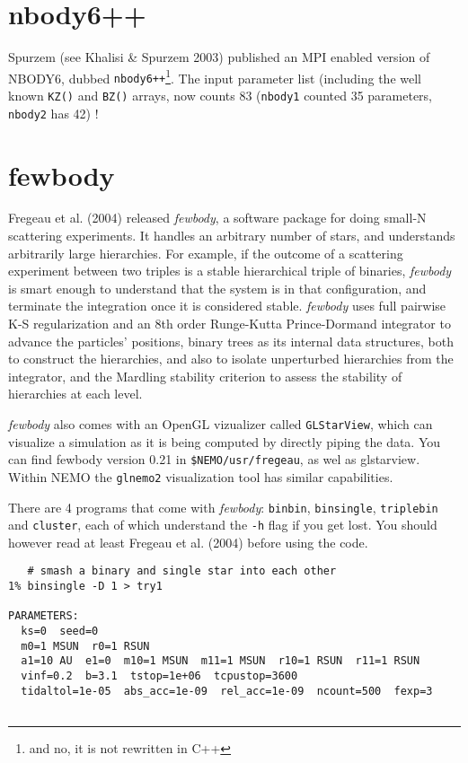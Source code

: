 {\section{nbody6++}

Spurzem (see Khalisi \& Spurzem 2003) published an MPI enabled version
of NBODY6, dubbed {\tt nbody6++}\footnote{and no, it is not rewritten in C++}.
The input parameter list (including the well known {\tt KZ()} and {\tt BZ()}
arrays, now counts 83  ({\tt nbody1} counted 35 parameters, {\tt nbody2} has 42) !

\section{fewbody}

Fregeau et al. (2004) released 
{\it fewbody}, a software package for doing
small-N scattering experiments. It handles an arbitrary number of stars,
and understands arbitrarily large hierarchies. For example, if the
outcome of a scattering experiment between two triples is a stable
hierarchical triple of binaries, {\it fewbody} is smart enough to
understand that the system is in that configuration, and terminate the
integration once it is considered stable. {\it fewbody} uses full pairwise
K-S regularization and an 8th order Runge-Kutta Prince-Dormand
integrator to advance the particles' positions, binary trees as its
internal data structures, both to construct the hierarchies, and also
to isolate unperturbed hierarchies from the integrator, and the
Mardling stability criterion to assess the stability of hierarchies at
each level.

{\it fewbody} also comes with an OpenGL vizualizer called {\tt GLStarView},
which can visualize a simulation as it is being computed by directly
piping the data. You can find fewbody  version 0.21 in {\tt \$NEMO/usr/fregeau},
as wel as glstarview. Within NEMO the {\tt glnemo2} visualization tool has
similar capabilities.

There are  4 programs that come with {\it fewbody}:
{\tt binbin}, {\tt binsingle}, {\tt triplebin} and {\tt cluster},
 each of which understand the
{\tt -h} flag if you get lost. You should however read at least
Fregeau et al. (2004) before using the code.

\footnotesize\begin{verbatim}
   # smash a binary and single star into each other
1% binsingle -D 1 > try1

PARAMETERS:
  ks=0  seed=0
  m0=1 MSUN  r0=1 RSUN
  a1=10 AU  e1=0  m10=1 MSUN  m11=1 MSUN  r10=1 RSUN  r11=1 RSUN
  vinf=0.2  b=3.1  tstop=1e+06  tcpustop=3600
  tidaltol=1e-05  abs_acc=1e-09  rel_acc=1e-09  ncount=500  fexp=3
 

\end{verbatim}}
